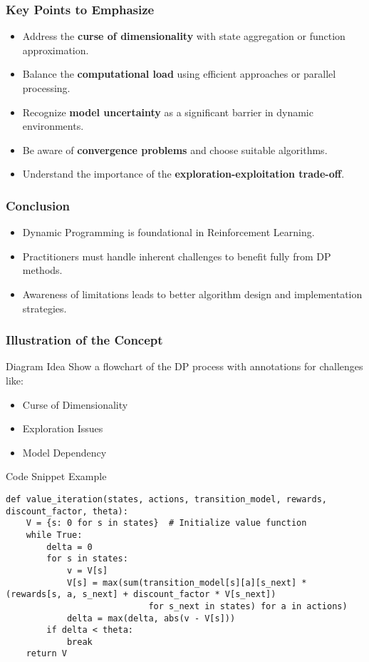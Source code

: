 \documentclass[aspectratio=169]{beamer}
\begin{document}
\begin{frame}
    \frametitle{Key Points to Emphasize}
    \begin{itemize}
        \item Address the \textbf{curse of dimensionality} with state aggregation or function approximation.
        \item Balance the \textbf{computational load} using efficient approaches or parallel processing.
        \item Recognize \textbf{model uncertainty} as a significant barrier in dynamic environments.
        \item Be aware of \textbf{convergence problems} and choose suitable algorithms.
        \item Understand the importance of the \textbf{exploration-exploitation trade-off}.
    \end{itemize}
\end{frame}

\begin{frame}
    \frametitle{Conclusion}
    \begin{itemize}
        \item Dynamic Programming is foundational in Reinforcement Learning.
        \item Practitioners must handle inherent challenges to benefit fully from DP methods.
        \item Awareness of limitations leads to better algorithm design and implementation strategies.
    \end{itemize}
\end{frame}

\begin{frame}[fragile]
    \frametitle{Illustration of the Concept}
    \begin{block}{Diagram Idea}
        Show a flowchart of the DP process with annotations for challenges like:
        \begin{itemize}
            \item Curse of Dimensionality
            \item Exploration Issues
            \item Model Dependency
        \end{itemize}
    \end{block}

    \begin{block}{Code Snippet Example}
        \begin{lstlisting}
def value_iteration(states, actions, transition_model, rewards, discount_factor, theta):
    V = {s: 0 for s in states}  # Initialize value function
    while True:
        delta = 0
        for s in states:
            v = V[s]
            V[s] = max(sum(transition_model[s][a][s_next] * (rewards[s, a, s_next] + discount_factor * V[s_next]) 
                            for s_next in states) for a in actions)
            delta = max(delta, abs(v - V[s]))
        if delta < theta:
            break
    return V
        \end{lstlisting}
    \end{block}
\end{frame}
\end{document}
